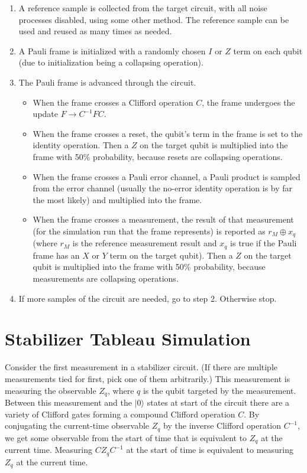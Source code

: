 \documentclass[onecolumn,unpublished]{quantumarticle}
\theoremstyle{definition}
\theoremstyle{definition}
\theoremstyle{definition}
\begin{document}
\begin{enumerate}
  \item A reference sample is collected from the target circuit, with all noise processes disabled, using some other method.
  The reference sample can be used and reused as many times as needed.
  \item A Pauli frame is initialized with a randomly chosen $I$ or $Z$ term on each qubit (due to initialization being a collapsing operation).
  \item The Pauli frame is advanced through the circuit.
  \begin{itemize}
      \item When the frame crosses a Clifford operation $C$, the frame undergoes the update $F \rightarrow C^{-1} F C$.
      \item When the frame crosses a reset, the qubit's term in the frame is set to the identity operation.
      Then a $Z$ on the target qubit is multiplied into the frame with 50\% probability, because resets are collapsing operations.
      \item When the frame crosses a Pauli error channel, a Pauli product is sampled from the error channel (usually the no-error identity operation is by far the most likely) and multiplied into the frame.
      \item When the frame crosses a measurement, the result of that measurement (for the simulation run that the frame represents) is reported as $r_M \oplus x_q$ (where $r_M$ is the reference measurement result and $x_q$ is true if the Pauli frame has an $X$ or $Y$ term on the target qubit).
      Then a $Z$ on the target qubit is multiplied into the frame with 50\% probability, because measurements are collapsing operations.
  \end{itemize}
  \item If more samples of the circuit are needed, go to step 2. Otherwise stop.
\end{enumerate}

\section{Stabilizer Tableau Simulation}
\label{sec:tableausim}

Consider the first measurement in a stabilizer circuit.
(If there are multiple measurements tied for first, pick one of them arbitrarily.)
This measurement is measuring the observable $Z_q$, where $q$ is the qubit targeted by the measurement.
Between this measurement and the $|0\rangle$ states at start of the circuit there are a variety of Clifford gates forming a compound Clifford operation $C$.
By conjugating the current-time observable $Z_q$ by the inverse Clifford operation $C^{-1}$, we get some observable from the start of time that is equivalent to $Z_q$ at the current time.
Measuring $C Z_q C^{-1}$ at the start of time is equivalent to measuring $Z_q$ at the current time.
\end{document}
